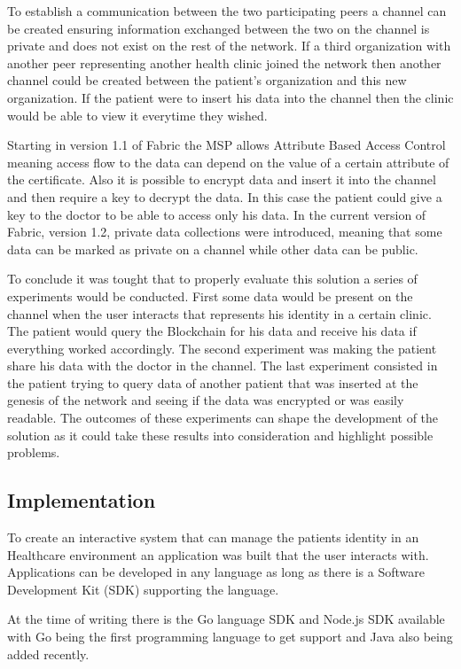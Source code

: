 To establish a communication between the two participating peers a channel can
be created ensuring information exchanged between the two on the channel is
private and does not exist on the rest of the network.  If a third organization
with another peer representing another health clinic joined the network then
another channel could be created between the patient's organization and this
new organization. If the patient were to insert his data into the channel then
the clinic would be able to view it everytime they wished. 

Starting in version 1.1 of Fabric the MSP allows Attribute Based Access Control
meaning access flow to the data can depend on the value of a certain attribute
of the certificate. Also it is possible to encrypt data and insert it into the
channel and then require a key to decrypt the data. In this case the patient
could give a key to the doctor to be able to access only his data. In the
current version of Fabric, version 1.2, private data collections were
introduced, meaning that some data can be marked as private on a channel while
other data can be public.

To conclude it was tought that to properly evaluate this solution a series of
experiments would be conducted. First some data would be present on the channel
when the user interacts that represents his identity in a certain clinic. The
patient would query the Blockchain for his data and receive his data if
everything worked accordingly. The second experiment was making the patient
share his data with the doctor in the channel. The last experiment consisted in
the patient trying to query data of another patient that was inserted at the
genesis of the network and seeing if the data was encrypted or was easily
readable. The outcomes of these experiments can shape the development of the
solution as it could take these results into consideration and highlight
possible problems.

\subsection{Implementation}

To create an interactive system that can manage the patients identity in an
Healthcare environment an application was built that the user interacts with.
Applications can be developed in any language as long as there is a Software
Development Kit (SDK) supporting the language. 

At the time of writing there is the Go language SDK and Node.js SDK available
with Go being the first programming language to get support and Java also being
added recently. 

